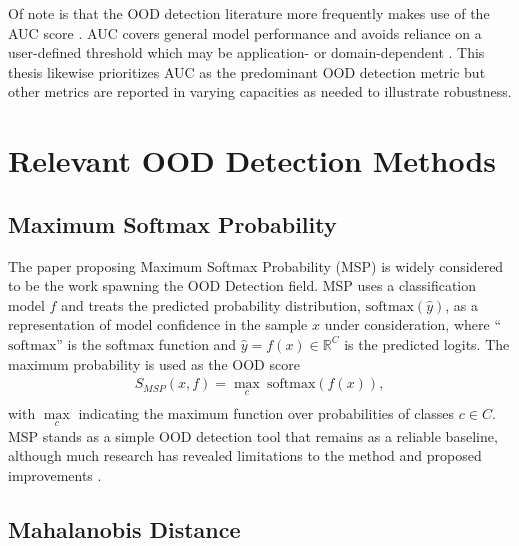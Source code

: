 Of note is that the OOD detection literature more frequently makes use of the AUC score \cite{bradley1997use,hendrycks2017baseline,lee2018simple}. AUC covers general model performance and avoids reliance on a user-defined threshold which may be application- or domain-dependent \cite{hendrycks2017baseline}. This thesis likewise prioritizes AUC as the predominant OOD detection metric but other metrics are reported in varying capacities as needed to illustrate robustness.

\section{Relevant OOD Detection Methods}

\subsection{Maximum Softmax Probability}

The paper proposing Maximum Softmax Probability (MSP) \cite{hendrycks2017baseline} is widely considered to be the work spawning the OOD Detection field. MSP uses a classification model $f$ and treats the predicted probability distribution, $\text{softmax}(\hat{y})$, as a representation of model confidence in the sample $x$ under consideration, where ``$\text{softmax}$'' is the softmax function and $\hat{y} = f(x) \in \mathbb{R}^C$ is the predicted logits. The maximum probability is used as the OOD score
\begin{equation}
\begin{aligned}
    S_{MSP}(x,f) = \max_c\ \text{softmax}(f(x)), \\
\end{aligned}
\end{equation}
with $\max\limits_{c}$ indicating the maximum function over probabilities of classes $c \in C$. MSP stands as a simple OOD detection tool that remains as a reliable baseline, although much research has revealed limitations to the method \cite{hendrycks2019scaling} and proposed improvements \cite{sun2021react}.

\subsection{Mahalanobis Distance}
\label{sec:bkgd-md}

